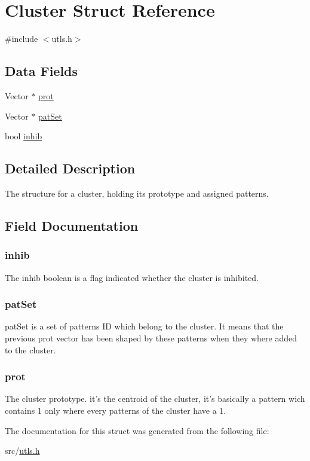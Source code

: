 \hypertarget{struct_cluster}{\section{Cluster Struct Reference}
\label{struct_cluster}
}


{\ttfamily \#include $<$utls.\-h$>$}

\subsection*{Data Fields}
\begin{DoxyCompactItemize}
\item 
Vector $\ast$ \hyperlink{struct_cluster_a5435b2d6c6d72ae1a3f1b330351df4e0}{prot}
\item 
Vector $\ast$ \hyperlink{struct_cluster_a0556b1f22ee46f5182612d02a05c24b3}{pat\-Set}
\item 
bool \hyperlink{struct_cluster_a1a40c90982b4564c988eafec3a43cb3c}{inhib}
\end{DoxyCompactItemize}


\subsection{Detailed Description}
The structure for a cluster, holding its prototype and assigned patterns. 

\subsection{Field Documentation}
\hypertarget{struct_cluster_a1a40c90982b4564c988eafec3a43cb3c}{
\subsubsection[{inhib}]{\setlength{\rightskip}{0pt plus 5cm}inhib}}\label{struct_cluster_a1a40c90982b4564c988eafec3a43cb3c}
The inhib boolean is a flag indicated whether the cluster is inhibited. \hypertarget{struct_cluster_a0556b1f22ee46f5182612d02a05c24b3}{
\subsubsection[{pat\-Set}]{\setlength{\rightskip}{0pt plus 5cm}pat\-Set}}\label{struct_cluster_a0556b1f22ee46f5182612d02a05c24b3}
pat\-Set is a set of patterns I\-D which belong to the cluster. It means that the previous prot vector has been shaped by these patterns when they where added to the cluster. \hypertarget{struct_cluster_a5435b2d6c6d72ae1a3f1b330351df4e0}{
\subsubsection[{prot}]{\setlength{\rightskip}{0pt plus 5cm}prot}}\label{struct_cluster_a5435b2d6c6d72ae1a3f1b330351df4e0}
The cluster prototype. it's the centroid of the cluster, it's basically a pattern wich contains 1 only where every patterns of the cluster have a 1. 

The documentation for this struct was generated from the following file\-:\begin{DoxyCompactItemize}
\item 
src/\hyperlink{utls_8h}{utls.\-h}\end{DoxyCompactItemize}

